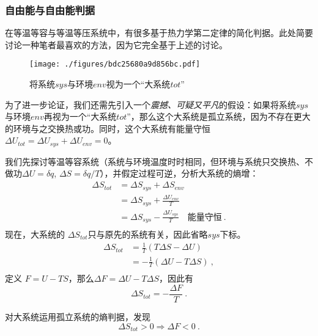 \subsubsection{自由能与自由能判据}
在等温等容与等温等压系统中，有很多基于热力学第二定律的简化判据。此处简要讨论一种笔者最喜欢的方法，因为它完全基于上述的讨论。

\begin{figure}[ht]
\centering
\texttt{[image: ./figures/bdc25680a9d856bc.pdf]}
\caption{将系统$sys$与环境$env$视为一个“大系统$tot$”} \label{fig_Td2Law_3}
\end{figure}

为了进一步论证，我们还需先引入一个\textsl{震撼、可疑又平凡}的假设：如果将系统$sys$与环境$env$再视为一个“大系统$tot$”，那么这个大系统是孤立系统，因为不存在更大的环境与之交换热或功。同时，这个大系统有能量守恒 $\Delta U_{tot} = \Delta U_{sys} + \Delta U_{env} = 0$。

我们先探讨等温等容系统（系统与环境温度时时相同，但环境与系统只交换热、不做功$\Delta U = \delta q$, $\Delta S = \delta q / T$），并假定过程可逆，分析大系统的熵增：
\begin{equation}
\begin{aligned}
\Delta {S_{tot}}
 &=\Delta {S_{sys}}+\Delta {S_{env}}\\
 & =\Delta {S_{sys}}+ \frac{\Delta U_{{env}}}{T}\\
 & = \Delta {S_{sys}} - \frac{\Delta U_{{sys}}}{T} \quad \text{能量守恒}~.\\
 \end{aligned}
\end{equation}
现在，大系统的 $\Delta {S_{tot}}$只与原先的系统有关，因此省略$sys$下标。
\begin{equation}
\begin{aligned}
\Delta {S_{tot}}
 & = \frac{1}{T}(T \Delta {S} -\Delta U )\\
 & = - \frac{1}{T}(\Delta U - T \Delta {S} )~,\\
\end{aligned}
\end{equation}
定义 $F = U-TS$，那么$\Delta F = \Delta U - T \Delta S$，因此有
\begin{equation}
\Delta S_{tot} = -\frac{\Delta F}{T}~.
\end{equation}

对大系统运用孤立系统的熵判据，发现
\begin{equation}
\Delta S_{tot} > 0\Rightarrow \Delta F < 0~.
\end{equation}

